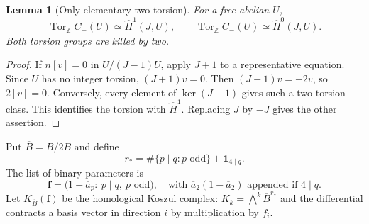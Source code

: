 \documentclass[11pt]{article}
\numberwithin{equation}{section}
\newtheorem{lemma}[theorem]{Lemma}
\theoremstyle{definition}
\theoremstyle{remark}
\DeclareMathOperator{\Tor}{Tor}
\newcommand{\Z}{\mathbb Z}
\newcommand{\HH}{\widehat H}
\begin{document}
\begin{lemma}[Only elementary two-torsion]
\label{lem:torsion}
For a free abelian $U$,
\[
 \Tor_{\Z} C_+(U)\simeq\HH^1(J,U),\qquad
 \Tor_{\Z} C_-(U)\simeq\HH^0(J,U).
\]
Both torsion groups are killed by two.
\end{lemma}
\begin{proof}
If $n[v]=0$ in $U/(J-1)U$, apply $J+1$ to a representative equation.
Since $U$ has no integer torsion, $(J+1)v=0$. Then
$(J-1)v=-2v$, so $2[v]=0$. Conversely, every element of
$\ker(J+1)$ gives such a two-torsion class. This identifies the torsion
with $\HH^1$. Replacing $J$ by $-J$ gives the other assertion.
\end{proof}

Put $\overline B=B/2B$ and define
\begin{equation}
 r_* = \#\{p\mid q:p\text{ odd}\}+\boldsymbol1_{4\mid q}.
 \label{eq:effective-primes}
\end{equation}
The list of binary parameters is
\begin{equation}
 \boldsymbol f=
 \bigl(1-\overline a_p:\ p\mid q,\ p\text{ odd}\bigr),
 \quad\text{with }\overline a_2(1-\overline a_2)
       \text{ appended if }4\mid q.
 \label{eq:binary-parameters}
\end{equation}
Let $K_{\overline B}(\boldsymbol f)$ be the homological Koszul complex:
$K_k=\bigwedge^k\overline B^{r_*}$ and the differential contracts a
basis vector in direction $i$ by multiplication by $f_i$.
\end{document}

